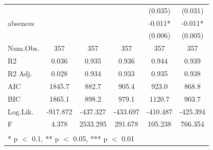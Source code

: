 \documentclass[12pt,english]{article}
\begin{document}
\begin{longtable}[c]{lccccc}
 &  &  &  & (0.035) & (0.031)\\
absences &  &  &  & -0.011* & -0.011*\\
 &  &  &  & (0.006) & (0.005)\\
\hline
Num.Obs. & 357 & 357 & 357 & 357 & 357\\
R2 & 0.036 & 0.935 & 0.936 & 0.944 & 0.939\\
R2 Adj. & 0.028 & 0.934 & 0.933 & 0.935 & 0.938\\
AIC & 1845.7 & 882.7 & 905.4 & 923.0 & 868.8\\
BIC & 1865.1 & 898.2 & 979.1 & 1120.7 & 903.7\\
Log.Lik. & -917.872 & -437.327 & -433.697 & -410.487 & -425.394\\
F & 4.378 & 2533.295 & 291.678 & 105.238 & 766.354\\
\hline
\multicolumn{5}{2}{\textsuperscript{} * p $<$ 0.1, ** p $<$ 0.05, *** p $<$ 0.01}\\
\end{longtable}
\clearpage
\end{document}
